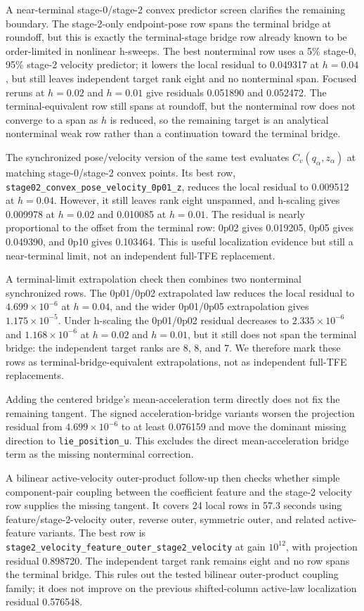 \documentclass[11pt]{article}
\newcommand{\tfe}{TFE}
\begin{document}
A near-terminal stage-0/stage-2 convex predictor screen clarifies the remaining
boundary.  The stage-2-only endpoint-pose row spans the terminal bridge at
roundoff, but this is exactly the terminal-stage bridge row already known to be
order-limited in nonlinear h-sweeps.  The best nonterminal row uses a 5\%
stage-0, 95\% stage-2 velocity predictor; it lowers the local residual to
0.049317 at $h=0.04$, but still leaves independent target rank eight and no
nonterminal span.  Focused reruns at $h=0.02$ and $h=0.01$ give residuals
0.051890 and 0.052472.  The terminal-equivalent row still spans at roundoff,
but the nonterminal row does not converge to a span as $h$ is reduced, so the
remaining target is an analytical nonterminal weak row rather than a
continuation toward the terminal bridge.

The synchronized pose/velocity version of the same test evaluates
$C_v(q_\alpha,z_\alpha)$ at matching stage-0/stage-2 convex points.  Its best
row, \nolinkurl{stage02_convex_pose_velocity_0p01_z}, reduces the local
residual to 0.009512 at $h=0.04$.  However, it still leaves rank eight
unspanned, and h-scaling gives 0.009978 at $h=0.02$ and 0.010085 at
$h=0.01$.  The residual is nearly proportional to the offset from the
terminal row: 0p02 gives 0.019205, 0p05 gives 0.049390, and 0p10 gives
0.103464.  This is useful localization evidence but still a near-terminal
limit, not an independent full-\tfe{} replacement.

A terminal-limit extrapolation check then combines two nonterminal synchronized
rows.  The 0p01/0p02 extrapolated law reduces the local residual to
$4.699\times10^{-6}$ at $h=0.04$, and the wider 0p01/0p05 extrapolation gives
$1.175\times10^{-5}$.  Under h-scaling the 0p01/0p02 residual decreases to
$2.335\times10^{-6}$ and $1.168\times10^{-6}$ at $h=0.02$ and $h=0.01$, but
it still does not span the terminal bridge: the independent target ranks are
8, 8, and 7.  We therefore mark these rows as terminal-bridge-equivalent
extrapolations, not as independent full-\tfe{} replacements.

Adding the centered bridge's mean-acceleration term directly does not fix the
remaining tangent.  The signed acceleration-bridge variants worsen the
projection residual from $4.699\times10^{-6}$ to at least 0.076159 and move
the dominant missing direction to \nolinkurl{lie_position_u}.  This excludes
the direct mean-acceleration bridge term as the missing nonterminal correction.

A bilinear active-velocity outer-product follow-up then checks whether simple
component-pair coupling between the coefficient feature and the stage-2
velocity row supplies the missing tangent.  It covers 24 local rows in 57.3
seconds using feature/stage-2-velocity outer, reverse outer, symmetric outer,
and related active-feature variants.  The best row is
\nolinkurl{stage2_velocity_feature_outer_stage2_velocity} at gain $10^{12}$,
with projection residual 0.898720.  The independent target rank remains eight
and no row spans the terminal bridge.  This rules out the tested bilinear
outer-product coupling family; it does not improve on the previous
shifted-column active-law localization residual 0.576548.
\end{document}
